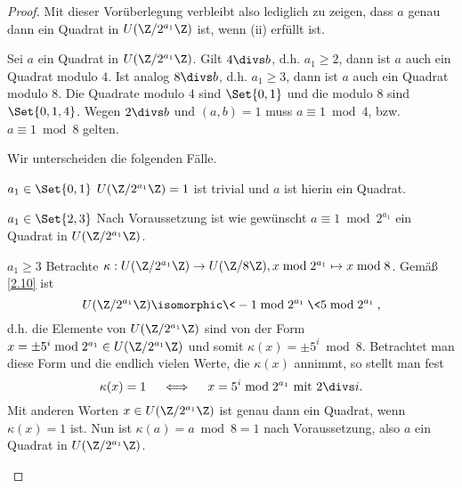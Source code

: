 \begin{st}
\begin{proof}
		Mit dieser Vorüberlegung verbleibt also lediglich zu zeigen, dass $a$ genau dann ein Quadrat in $U(\Z / 2^{a_1} \Z)$ ist, wenn (ii) erfüllt ist.
		\begin{seg}{\ProofImplication}
			Sei $a$ ein Quadrat in $U(\Z / 2^{a_1}\Z)$.
			Gilt $4 \divs b$, d.h. $a_1 \ge 2$, dann ist $a$ auch ein Quadrat modulo $4$.
			Ist analog $8 \divs b$, d.h. $a_1 \ge 3$, dann ist $a$ auch ein Quadrat modulo $8$.
			Die Quadrate modulo $4$ sind $\Set{0, 1}$ und die modulo $8$ sind $\Set{0, 1, 4}$.
			Wegen $2 \divs b$ und $(a, b) = 1$ muss $a \equiv 1 \bmod 4$, bzw. $a \equiv 1 \bmod 8$ gelten.
		\end{seg}
		\begin{seg}{\ProofImplication*}
			Wir unterscheiden die folgenden Fälle.
			\begin{segnb}{$a_1 \in \Set{0, 1}$}
				$U(\Z / 2^{a_1} \Z) = 1$ ist trivial und $a$ ist hierin ein Quadrat.
			\end{segnb}
			\begin{segnb}{$a_1 \in \Set{2, 3}$}
				Nach Voraussetzung ist wie gewünscht $a \equiv 1 \bmod 2^{a_1}$ ein Quadrat in $U(\Z / 2^{a_1} \Z)$.
			\end{segnb}
			\begin{segnb}{$a_1 \ge 3$}
				Betrachte $\kappa: U(\Z / 2^{a_1} \Z) \to U(\Z / 8\Z), x \bmod 2^{a_1} \mapsto x \bmod 8$.
				Gemäß \ref{2.10} ist
				\[
					U(\Z / 2^{a_1} \Z) \isomorphic \<-1 \bmod 2^{a_1}\> \<5 \bmod 2^{a_1}\>,
				\]
				d.h. die Elemente von $U(\Z / 2^{a_1} \Z)$ sind von der Form $x = \pm 5^i \bmod 2^{a_1} \in U(\Z / 2^{a_1} \Z)$ und somit $\kappa(x) = \pm 5^i \bmod 8$.
				Betrachtet man diese Form und die endlich vielen Werte, die $\kappa(x)$ annimmt, so stellt man fest
				\[
					\kappa(x) = 1 \quad\iff\quad x = 5^i \bmod 2^{a_1} \text{ mit } 2 \divs i.
				\]
				Mit anderen Worten $x \in U(\Z / 2^{a_1} \Z)$ ist genau dann ein Quadrat, wenn $\kappa(x) = 1$ ist.
				Nun ist $\kappa(a) = a \bmod 8 = 1$ nach Voraussetzung, also $a$ ein Quadrat in $U(\Z / 2^{a_1} \Z)$.
			\end{segnb}
		\end{seg}
	\end{proof}
\end{st}







